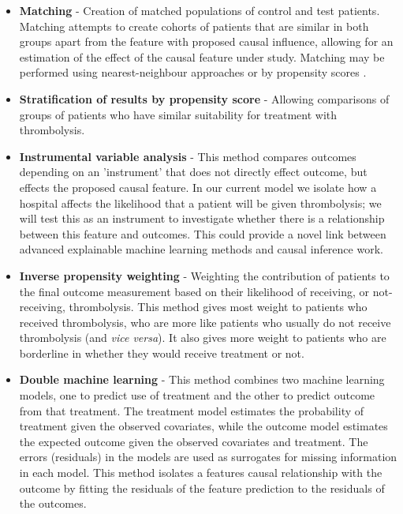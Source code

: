 \begin{itemize}
    \item \textbf{Matching} - Creation of matched populations of control and test patients. Matching attempts to create cohorts of patients that are similar in both groups apart from the feature with proposed causal influence, allowing for an estimation of the effect of the causal feature under study. Matching may be performed using nearest-neighbour approaches \cite{stuart_matching_2010} or by propensity scores \cite{rosenbaum_central_1983}.

    \item \textbf{Stratification of results by propensity score} \cite{rosenbaum_central_1983} - Allowing comparisons of groups of patients who have similar suitability for treatment with thrombolysis.

    \item \textbf{Instrumental variable analysis} \cite{stel_instrumental_2013} - This method compares outcomes depending on an 'instrument' that does not directly effect outcome, but effects the proposed causal feature. In our current model we isolate how a hospital affects the likelihood that a patient will be given thrombolysis; we will test this as an instrument to investigate whether there is a relationship between this feature and outcomes. This could provide a novel link between advanced explainable machine learning methods and causal inference work.
           
    \item \textbf{Inverse propensity weighting} \cite{glynn_introduction_2010} - Weighting the contribution of patients to the final outcome measurement based on their likelihood of receiving, or not-receiving, thrombolysis. This method gives most weight to patients who received thrombolysis, who are more like patients who usually do not receive thrombolysis (and \textit{vice versa}). It also gives more weight to patients who are borderline in whether they would receive treatment or not.   
       
    \item \textbf{Double machine learning} \cite{chernozhukov_doubledebiased_2017} - This method combines two machine learning models, one to predict use of treatment and the other to predict outcome from that treatment. The treatment model estimates the probability of treatment given the observed covariates, while the outcome model estimates the expected outcome given the observed covariates and treatment. The errors (residuals) in the models are used as surrogates for missing information in each model. This method isolates a features causal relationship with the outcome by fitting the residuals of the feature prediction to the residuals of the outcomes.
\end{itemize}

